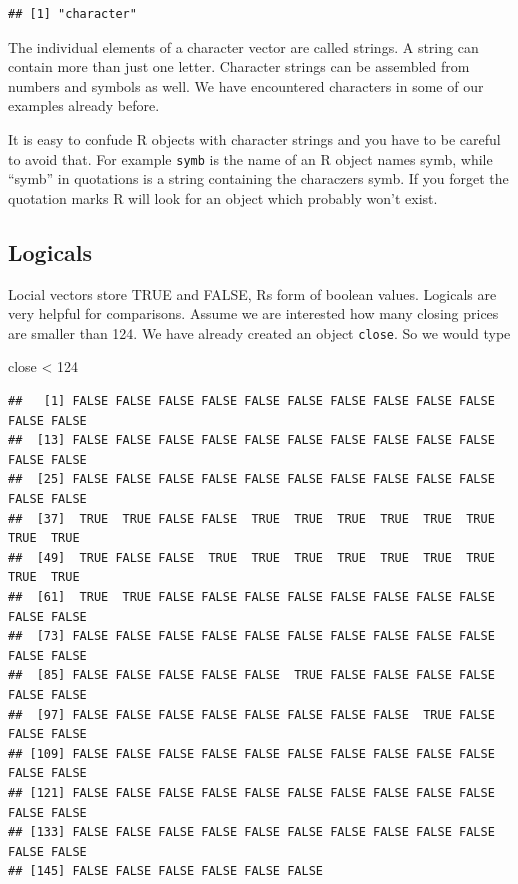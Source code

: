 \documentclass[
]{book}
\newenvironment{Shaded}{\begin{snugshade}}{\end{snugshade}}
\newcommand{\DecValTok}[1]{\textcolor[rgb]{0.00,0.00,0.81}{#1}}
\newcommand{\NormalTok}[1]{#1}
\newcommand{\SpecialCharTok}[1]{\textcolor[rgb]{0.00,0.00,0.00}{#1}}
\begin{document}
\begin{verbatim}
## [1] "character"
\end{verbatim}

The individual elements of a character vector are called strings. A string can contain more than
just one letter. Character strings can be assembled from numbers and symbols as well. We
have encountered characters in some of our examples already before.

It is easy to confude R objects with character strings and you have to be careful to avoid that.
For example \texttt{symb} is the name of an R object names symb, while ``symb'' in quotations is a string
containing the characzers symb. If you forget the quotation marks R will look for an object which
probably won't exist.

\hypertarget{logicals}{%
\subsection{Logicals}\label{logicals}}

Locial vectors store TRUE and FALSE, Rs form of boolean values. Logicals are very helpful
for comparisons. Assume we are interested how many closing prices are smaller than 124.
We have already created an object \texttt{close}. So we would type

\begin{Shaded}
\begin{Highlighting}[]
\NormalTok{close }\SpecialCharTok{\textless{}} \DecValTok{124}
\end{Highlighting}
\end{Shaded}

\begin{verbatim}
##   [1] FALSE FALSE FALSE FALSE FALSE FALSE FALSE FALSE FALSE FALSE FALSE FALSE
##  [13] FALSE FALSE FALSE FALSE FALSE FALSE FALSE FALSE FALSE FALSE FALSE FALSE
##  [25] FALSE FALSE FALSE FALSE FALSE FALSE FALSE FALSE FALSE FALSE FALSE FALSE
##  [37]  TRUE  TRUE FALSE FALSE  TRUE  TRUE  TRUE  TRUE  TRUE  TRUE  TRUE  TRUE
##  [49]  TRUE FALSE FALSE  TRUE  TRUE  TRUE  TRUE  TRUE  TRUE  TRUE  TRUE  TRUE
##  [61]  TRUE  TRUE FALSE FALSE FALSE FALSE FALSE FALSE FALSE FALSE FALSE FALSE
##  [73] FALSE FALSE FALSE FALSE FALSE FALSE FALSE FALSE FALSE FALSE FALSE FALSE
##  [85] FALSE FALSE FALSE FALSE FALSE  TRUE FALSE FALSE FALSE FALSE FALSE FALSE
##  [97] FALSE FALSE FALSE FALSE FALSE FALSE FALSE FALSE  TRUE FALSE FALSE FALSE
## [109] FALSE FALSE FALSE FALSE FALSE FALSE FALSE FALSE FALSE FALSE FALSE FALSE
## [121] FALSE FALSE FALSE FALSE FALSE FALSE FALSE FALSE FALSE FALSE FALSE FALSE
## [133] FALSE FALSE FALSE FALSE FALSE FALSE FALSE FALSE FALSE FALSE FALSE FALSE
## [145] FALSE FALSE FALSE FALSE FALSE FALSE
\end{verbatim}
\end{document}
